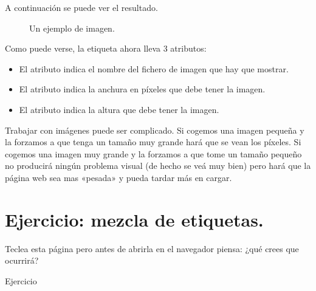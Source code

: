 \documentclass[a4paper,12pt,spanish]{sphinxmanual}
\begin{document}
A continuación se puede ver el resultado.

\begin{figure}[htbp]
\centering
\capstart

\noindent{}
\caption{Un ejemplo de imagen.}\label{\detokenize{index:id15}}\end{figure}

Como puede verse, la etiqueta  ahora lleva 3 atributos:
\begin{itemize}
\item {} 
El atributo  indica el nombre del fichero de imagen que hay que mostrar.

\item {} 
El atributo  indica la anchura en píxeles que debe tener la imagen.

\item {} 
El atributo  indica la altura que debe tener la imagen.

\end{itemize}

Trabajar con imágenes puede ser complicado. Si cogemos una imagen pequeña y la forzamos a que tenga un tamaño muy grande hará que se vean los píxeles. Si cogemos una imagen muy grande y la forzamos a que tome un tamaño pequeño no producirá ningún problema visual (de hecho se veá muy bien) pero hará que la página web sea mas «pesada» y pueda tardar más en cargar.


\section{Ejercicio: mezcla de etiquetas.}
\label{\detokenize{index:ejercicio-mezcla-de-etiquetas}}
Teclea esta página pero antes de abrirla en el navegador piensa: ¿qué crees que ocurrirá?

%
\begin{sphinxVerbatim}[commandchars=\\\{\}]
    Ejercicio
     
           
\end{sphinxVerbatim}
\end{document}
